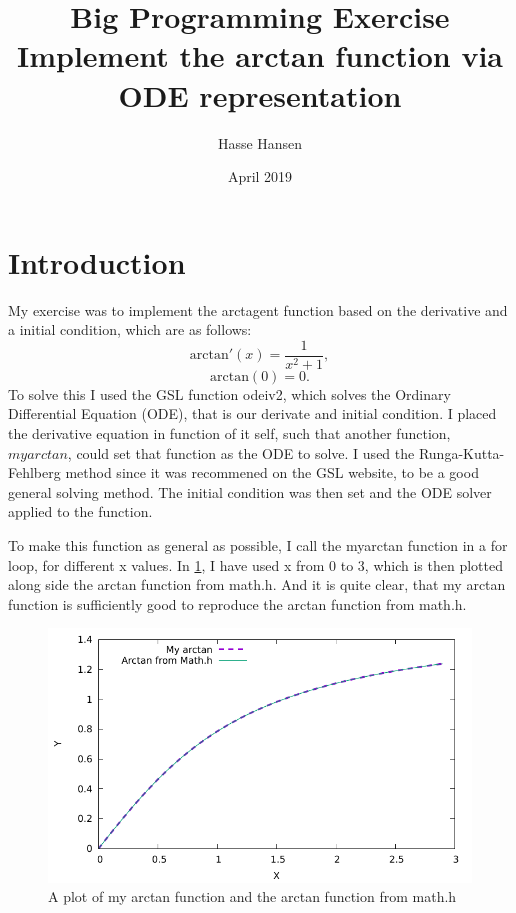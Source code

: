 \documentclass{article}
\title{Big Programming Exercise \\ 
Implement the arctan function via ODE representation}
\author{Hasse Hansen}
\date{April 2019}
\begin{document}
\maketitle

\section{Introduction}
My exercise was to implement the arctagent function based on the derivative and a initial condition, which are as follows:
\begin{equation}
    \mathrm{arctan}'(x)= \frac{1}{x^2 + 1},
\end{equation}
\begin{equation} 
    \mathrm{arctan}(0)=0.
\end{equation}
To solve this I used the GSL function odeiv2, which solves the Ordinary Differential Equation (ODE), that is our derivate and initial condition. I placed the derivative equation in function of it self, such that another function, $myarctan$, could set that function as the ODE to solve. I used the Runga-Kutta-Fehlberg method since it was recommened on the GSL website, to be a good general solving method. The initial condition was then set and the ODE solver applied to the function. 

To make this function as general as possible, I call the myarctan function in a for loop, for different x values. In \cref{fig:arctan}, I have used x from 0 to 3, which is then plotted along side the arctan function from math.h. And it is quite clear, that my arctan function is sufficiently good to reproduce the arctan function from math.h. 



\begin{figure}
    \centering
    \includegraphics[width = \linewidth]{Atan.pdf}
    \caption{A plot of my arctan function and the arctan function from math.h}
    \label{fig:arctan}
\end{figure}
\end{document}
